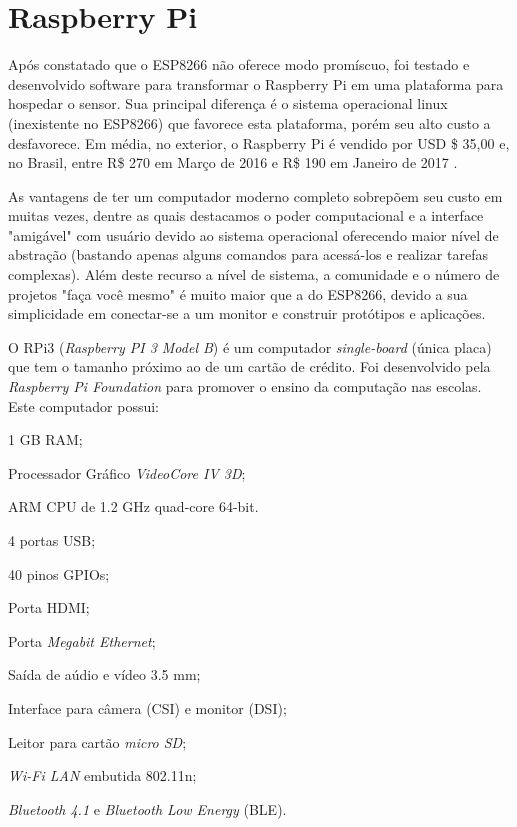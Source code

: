 
\section{Raspberry Pi}
\label{sec:Raspberry-Pi}

Após constatado que o ESP8266 não oferece modo promíscuo, foi testado e
desenvolvido software para transformar o Raspberry Pi em uma plataforma para
hospedar o sensor. Sua principal diferença é o sistema operacional linux
(inexistente no ESP8266) que favorece esta plataforma, porém seu alto custo a
desfavorece. Em média, no exterior, o Raspberry Pi é vendido por USD \$ 35,00
\cite{RPI2016} e, no Brasil, entre R\$ 270 em Março de 2016 e R\$ 190 em Janeiro
de 2017 \cite{rpi3-mercadolivre}.

As vantagens de ter um computador moderno completo sobrepõem seu custo em muitas
vezes, dentre as quais destacamos o poder computacional e a interface "amigável"  com usuário devido ao
sistema operacional oferecendo maior nível de abstração (bastando apenas alguns
comandos para acessá-los e realizar tarefas complexas).
Além deste recurso a nível de sistema, a comunidade e o número de projetos "faça
você mesmo"  é muito maior que a do ESP8266, devido a sua simplicidade em
conectar-se a um monitor e construir protótipos e aplicações.

O RPi3 (\emph{Raspberry PI 3 Model B}) é um computador \emph{single-board}  (única
placa) que tem o tamanho próximo ao de um cartão de crédito. Foi desenvolvido
pela \emph{Raspberry Pi Foundation} para promover o ensino da computação nas
escolas. Este computador possui:


\begin{alineas}
	\item 1 GB RAM;

	\item Processador Gráfico \emph{VideoCore IV 3D};

	\item ARM CPU de 1.2 GHz quad-core 64-bit.

	\item 4 portas USB;

	\item 40 pinos GPIOs;

	\item Porta HDMI;

	\item Porta \emph{Megabit Ethernet};

	\item Saída de aúdio e vídeo 3.5 mm;

	\item Interface para câmera (CSI) e monitor (DSI);

	\item Leitor para cartão \emph{micro SD};

	\item \emph{Wi-Fi LAN} embutida 802.11n;

	\item \emph{Bluetooth 4.1} e \emph{Bluetooth Low Energy} (BLE).

\end{alineas}

